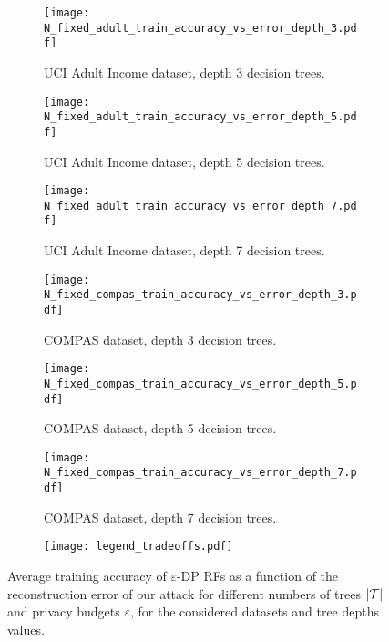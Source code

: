 \begin{figure*}[htb]
\begin{subfigure}{0.5\textwidth}
    \centering
    \texttt{[image: N\_fixed\_adult\_train\_accuracy\_vs\_error\_depth\_3.pdf]}
    \caption{UCI Adult Income dataset, depth 3 decision trees.} \label{fig:results_tradeoffs_acc_reconstr_adult_depth_3}
\end{subfigure}%
\hfill
 \begin{subfigure}{0.5\textwidth}
    \centering
    \texttt{[image: N\_fixed\_adult\_train\_accuracy\_vs\_error\_depth\_5.pdf]}
    \caption{UCI Adult Income dataset, depth 5 decision trees.}
\label{fig:results_tradeoffs_acc_reconstr_adult_depth_5}
\end{subfigure}%

\vspace{10pt}

\begin{subfigure}{0.5\textwidth}
    \centering
    \texttt{[image: N\_fixed\_adult\_train\_accuracy\_vs\_error\_depth\_7.pdf]}
    \caption{UCI Adult Income dataset, depth 7 decision trees.}
    \label{fig:results_tradeoffs_acc_reconstr_adult_depth_7}
\end{subfigure}
\hfill
\begin{subfigure}{0.5\textwidth}
    \centering
    \texttt{[image: N\_fixed\_compas\_train\_accuracy\_vs\_error\_depth\_3.pdf]}
    \caption{COMPAS dataset, depth 3 decision trees.}
    \label{fig:results_tradeoffs_acc_reconstr_COMPAS_depth_3}
\end{subfigure}

\vspace{10pt}

\begin{subfigure}{0.5\textwidth}
    \centering
    \texttt{[image: N\_fixed\_compas\_train\_accuracy\_vs\_error\_depth\_5.pdf]}
    \caption{COMPAS dataset, depth 5 decision trees.}
    \label{fig:results_tradeoffs_acc_reconstr_COMPAS_depth_5}
\end{subfigure}
\hfill
\begin{subfigure}{0.5\textwidth}
    \centering
    \texttt{[image: N\_fixed\_compas\_train\_accuracy\_vs\_error\_depth\_7.pdf]}
    \caption{COMPAS dataset, depth 7 decision trees.}
    \label{fig:results_tradeoffs_acc_reconstr_COMPAS_depth_7}
\end{subfigure}

\vspace{10pt}

\begin{subfigure}{\textwidth}
    \centering
    \texttt{[image: legend\_tradeoffs.pdf]}
\end{subfigure}
\caption{Average training accuracy of $\varepsilon$-DP RFs as a function of the reconstruction error of our attack for different numbers of trees $\vert \mathcal{T} \rvert$ and privacy budgets $\varepsilon$, for the considered datasets and tree depths values.}\label{fig:results_all_tradeoffs_predictive_perf_vs_recontr_error}
\end{figure*}

